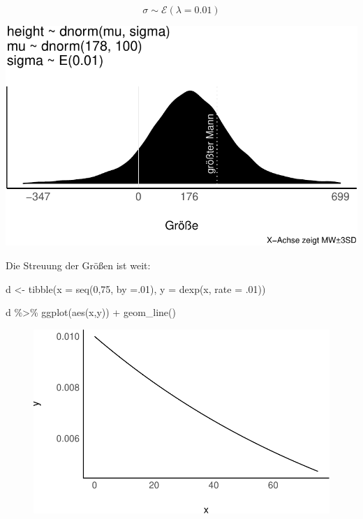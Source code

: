 \documentclass[
  a4paper,
  DIV=11]{scrreprt}
\newenvironment{Shaded}{\begin{snugshade}}{\end{snugshade}}
\newcommand{\AttributeTok}[1]{\textcolor[rgb]{0.40,0.45,0.13}{#1}}
\newcommand{\DecValTok}[1]{\textcolor[rgb]{0.68,0.00,0.00}{#1}}
\newcommand{\FunctionTok}[1]{\textcolor[rgb]{0.28,0.35,0.67}{#1}}
\newcommand{\NormalTok}[1]{\textcolor[rgb]{0.00,0.23,0.31}{#1}}
\newcommand{\OtherTok}[1]{\textcolor[rgb]{0.00,0.23,0.31}{#1}}
\newcommand{\SpecialCharTok}[1]{\textcolor[rgb]{0.37,0.37,0.37}{#1}}
\theoremstyle{definition}
\theoremstyle{remark}
\begin{document}
\[\sigma \sim \mathcal{E}(\lambda=0.01)\]

\includegraphics{./gauss_files/figure-pdf/Kung-16-1.pdf}

Die Streuung der Größen ist weit:

\begin{Shaded}
\begin{Highlighting}[]
\NormalTok{d }\OtherTok{\textless{}{-}} 
  \FunctionTok{tibble}\NormalTok{(}\AttributeTok{x =} \FunctionTok{seq}\NormalTok{(}\DecValTok{0}\NormalTok{,}\DecValTok{75}\NormalTok{, }\AttributeTok{by =}\NormalTok{.}\DecValTok{01}\NormalTok{),}
         \AttributeTok{y =} \FunctionTok{dexp}\NormalTok{(x, }\AttributeTok{rate =}\NormalTok{ .}\DecValTok{01}\NormalTok{))}

\NormalTok{d }\SpecialCharTok{\%\textgreater{}\%} 
  \FunctionTok{ggplot}\NormalTok{(}\FunctionTok{aes}\NormalTok{(x,y)) }\SpecialCharTok{+}
  \FunctionTok{geom\_line}\NormalTok{()}
\end{Highlighting}
\end{Shaded}

\begin{figure}[H]

{\centering \includegraphics{./gauss_files/figure-pdf/Kung-3-1.pdf}

}

\end{figure}
\end{document}
